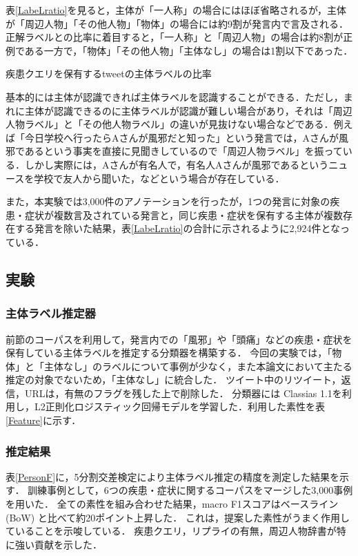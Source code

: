 \documentclass[japanese]{jnlp_1.4}
\begin{document}
表\ref{LabeLratio}を見ると，主体が「一人称」の場合にはほぼ省略されるが，主体が「周辺人物」「その他人物」「物体」の場合には約9割が発言内で言及される．
正解ラベルとの比率に着目すると，「一人称」と「周辺人物」の場合は約8割が正例である一方で，「物体」「その他人物」「主体なし」の場合は1割以下であった．

\begin{table}[t]
\caption{疾患クエリを保有するtweetの主体ラベルの比率}
\label{LabeLratio}

\end{table}

基本的には主体が認識できれば主体ラベルを認識することができる．ただし，まれに主体が認識できるのに主体ラベルが認識が難しい場合があり，それは「周辺人物ラベル」と「その他人物ラベル」の違いが見抜けない場合などである．例えば「今日学校へ行ったらAさんが風邪だと知った」という発言では，Aさんが風邪であるという事実を直接に見聞きしているので「周辺人物ラベル」を振っている．しかし実際には，Aさんが有名人で，有名人Aさんが風邪であるというニュースを学校で友人から聞いた，などという場合が存在している．

また，本実験では3,000件のアノテーションを行ったが，1つの発言に対象の疾患・症状が複数言及されている発言と，同じ疾患・症状を保有する主体が複数存在する発言を除いた結果，表\ref{LabeLratio}の合計に示されるように2,924件となっている．


\subsection{実験}

\subsubsection{主体ラベル推定器}

前節のコーパスを利用して，発言内での「風邪」や「頭痛」などの疾患・症状を保有している主体ラベルを推定する分類器を構築する．
今回の実験では，「物体」と「主体なし」のラベルについて事例が少なく，また本論文において主たる推定の対象でないため，「主体なし」に統合した．
ツイート中のリツイート，返信，URLは，有無のフラグを残した上で削除した．
分類器には Classias 1.1を利用し，L2正則化ロジスティック回帰モデルを学習した．利用した素性を表\ref{Feature}に示す．


\subsubsection{推定結果}
\label{sec:result}

表\ref{PersonF}に，5分割交差検定により主体ラベル推定の精度を測定した結果を示す．
訓練事例として，6つの疾患・症状に関するコーパスをマージした3,000事例を用いた．
全ての素性を組み合わせた結果，macro F1スコアはベースライン (BoW) と比べて約20ポイント上昇した．
これは，提案した素性がうまく作用していることを示唆している．
疾患クエリ，リプライの有無，周辺人物辞書が特に強い貢献を示した．
\end{document}
